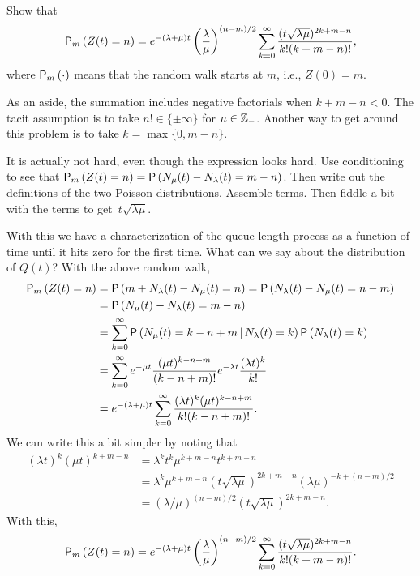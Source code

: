 \begin{exercise}  [\faCalculator]
Show that
\begin{equation*}
    \P{Z(t)=n}_m 
= e^{-(\lambda+\mu)t} \left(\frac\lambda\mu\right)^{(n-m)/2} \sum_{k=0}^\infty 
\frac{(t\sqrt{\lambda\mu} )^{2k+m-n}}{k!(k+m-n)!},
\end{equation*}
where $\P{\cdot}_m$ means that the random walk starts at $m$, i.e.,
$Z(0)=m$.

As an aside, the summation includes negative factorials when
$k+m-n<0$. The tacit assumption is to take $n!\in \{\pm \infty\}$ for
$n\in \mathbb{Z}_-$. Another way to get around this problem is to take
$k=\max\{0, m-n\}$.
\begin{hint}
It is actually not hard, even though the expression looks
  hard. Use conditioning to see that
  $\P{Z(t)=n}_m = \P{N_\mu(t) - N_\lambda(t) = m - n}$. Then write out
  the definitions of the two Poisson distributions. Assemble
  terms. Then fiddle a bit with the terms to get~$t\sqrt{\lambda\mu}$. 
\end{hint}
\begin{solution}
With this we have a characterization of the queue length process as a
function of time until it hits zero for the first time. What can we
say about the distribution of $Q(t)$? With the above random walk, 
\begin{equation}\label{eq:29}
  \begin{split}
    \P{Z(t)=n}_m
&= \P{m+N_\lambda(t) - N_\mu(t) = n }  = \P{N_\lambda(t) - N_\mu(t) = n-m }  \\
&= \P{N_\mu(t) - N_\lambda(t) = m-n }  \\
&= \sum_{k=0}^\infty \P{N_\mu(t) = k - n + m\given N_\lambda(t) = k } \P{N_\lambda(t)=k}\\
&= \sum_{k=0}^\infty e^{-\mu t} \frac{(\mu t)^{k -n+m}}{(k-n +m)!} e^{-\lambda t} \frac{(\lambda t)^k}{k!} \\
&= e^{-(\lambda+\mu)t} \sum_{k=0}^\infty \frac{(\lambda t)^k(\mu t)^{k  -n + m }}{k!(k-n+m)!}.
  \end{split}
\end{equation}
We can write this a bit simpler by noting that
\begin{align*}
  (\lambda t)^k (\mu t) ^{k + m - n}  
&=  \lambda^k t^k\mu^{k + m - n} t^{k+m-n} \\
&= \lambda^k \mu^{k + m - n} (t\sqrt{\lambda \mu})^{2k+m-n} (\lambda\mu)^{-k + (n-m)/2} \\
&= (\lambda/\mu)^{(n-m)/2} (t\sqrt{\lambda \mu})^{2k+m-n}.
\end{align*}
With this,
\begin{equation*}
    \P{Z(t)=n}_m 
= e^{-(\lambda+\mu)t} \left(\frac\lambda\mu\right)^{(n-m)/2} \sum_{k=0}^\infty 
\frac{(t\sqrt{\lambda\mu} )^{2k+m-n}}{k!(k+m-n)!}.
\end{equation*}
\end{solution}
\end{exercise}


